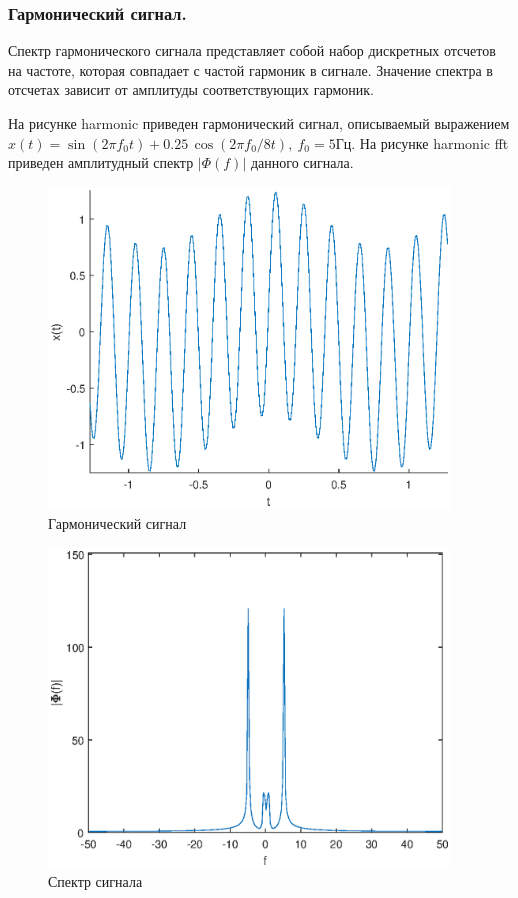 \documentclass[a4paper,14pt]{extarticle}
\begin{document}
\subsubsection{Гармонический сигнал.}
Спектр гармонического сигнала представляет собой набор дискретных отсчетов на частоте, которая совпадает с частой гармоник в сигнале. Значение спектра в отсчетах зависит от амплитуды соответствующих гармоник. 

На рисунке harmonic приведен гармонический сигнал, описываемый выражением $x(t) = \sin(2 \pi f_0 t) + 0.25 \, \cos(2 \pi f_0/8 t), ~ f_0 = 5\text{Гц}$. На рисунке harmonic fft приведен амплитудный спектр $|\Phi(f)|$ данного сигнала.	

\begin{figure}[H]
\centering
\includegraphics[width=0.95\textwidth]{harmonic.eps}
\captionsetup{justification=centering,margin=2cm}
\caption{Гармонический сигнал}
\label{harmonic}
\end{figure}

\begin{figure}[H]
\centering
\includegraphics[width=0.95\textwidth]{harmonic_fft.eps}
\captionsetup{justification=centering,margin=1cm}
\caption{Спектр сигнала}
\label{harmonic_fft}
\end{figure}
\end{document}
